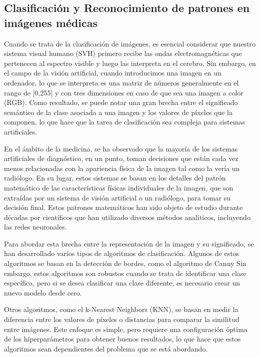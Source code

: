 \subsection*{Clasificación y Reconocimiento de patrones en imágenes médicas}  

Cuando se trata de la clasificación de imágenes, es esencial considerar que nuestro sistema visual humano (SVH) primero recibe las ondas electromagnéticas que pertenecen al espectro visible y luego las interpreta en el cerebro. Sin embargo, en el campo de la visión artificial, cuando introducimos una imagen en un ordenador, lo que se interpreta es una matriz de números generalmente en el rango de [0,255] y con tres dimensiones en caso de que sea una imagen a color (RGB). Como resultado, se puede notar una gran brecha entre el significado semántico de la clase asociada a una imagen y los valores de píxeles que la componen, lo que hace que la tarea de clasificación sea compleja para sistemas artificiales. 

En el ámbito de la medicina, se ha observado que la mayoría de los sistemas artificiales de diagnóstico, en un punto, toman decisiones que están cada vez menos relacionadas con la apariencia física de la imagen tal como la vería un radiólogo. En su lugar, estos sistemas se basan en los detalles del patrón matemático de las características físicas individuales de la imagen, que son extraídas por un sistema de visión artificial o un radiólogo, para tomar su decisión final. Estos patrones matemáticos han sido objeto de estudio durante décadas por científicos que han utilizado diversos métodos analíticos, incluyendo las redes neuronales. %

Para abordar esta brecha entre la representación de la imagen y su significado, se han desarrollado varios tipos de algoritmos de clasificación. Algunos de estos algoritmos se basan en la detección de bordes, como el algoritmo de Canny %
Sin embargo, estos algoritmos son robustos cuando se trata de identificar una clase específica, pero si se desea clasificar una clase diferente, es necesario crear un nuevo modelo desde cero.

Otros algoritmos, como el k-Nearest Neighbors (KNN), se basan en medir la diferencia entre los valores de píxeles o distancias para comparar la similitud entre imágenes. Este enfoque es simple, pero requiere una configuración óptima de los hiperparámetros para obtener buenos resultados, lo que hace que estos algoritmos sean dependientes del problema que se está abordando.


